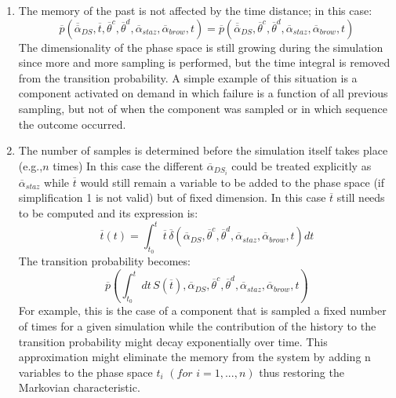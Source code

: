 \begin{enumerate}
  \item The memory of the past is not affected by the time distance; in this case:
  \begin{equation}
   \overline{p}\left ( \overline{\overline{\alpha}}_{DS},\overline{t},\overline{\theta}^{c},\overline{\theta}^{d},\overline{\alpha}_{staz},\overline{\alpha}_{brow},t  \right ) =  \overline{p}\left ( \overline{\overline{\alpha}}_{DS},\overline{\theta}^{c},\overline{\theta}^{d},\overline{\alpha}_{staz},\overline{\alpha}_{brow},t  \right )
  \end{equation}
  The dimensionality of the phase space is still growing during the simulation since more and more sampling is 
  performed, but the time integral is removed from the transition probability. A simple example of this situation is 
  a component activated on demand in which failure is a function of all previous sampling, but not of when the 
  component was sampled or in which sequence the outcome occurred.
  \item  The number of samples is determined before the simulation itself takes place (e.g.,$n$ times) In this case 
  the different $\overline{\alpha}_{DS_{i}}$ could be treated explicitly as $\overline{\alpha}_{staz}$   while 
  $\overline{t}$ would still remain a variable to be added to the phase space (if simplification 1 is not valid) but of 
  fixed dimension. In this case $\overline{t}$ still needs to be computed and its expression is:
  \begin{equation}
   \overline{t} \left ( t \right ) = \int_{t_{0}}^{t} \overline{t}  \, \overline{\delta }\left ( \overline{\alpha }_{DS}, 
   \overline{\theta}^{c},\overline{\theta}^{d},\overline{\alpha}_{staz},\overline{\alpha}_{brow},t \right )  dt
  \end{equation}
  The transition probability becomes:
  \begin{equation}
     \overline{p}\left ( \int_{t_{0}}^{t} dt\, S\left ( \overline{t} \right ), \overline{\alpha}_{DS}, \overline{\theta}^{c},
     \overline{\theta}^{d},\overline{\alpha}_{staz},\overline{\alpha}_{brow},t \right )
  \end{equation}
  For example, this is the case of a component that is sampled a fixed number of times for a given simulation 
  while the contribution of the history to the transition probability might decay exponentially over time. This 
  approximation might eliminate the memory from the system by adding n variables to the phase space $t_{i} \, \, 
  (for \, \, i=1,...,n)$ thus restoring the Markovian characteristic.

\end{enumerate}
